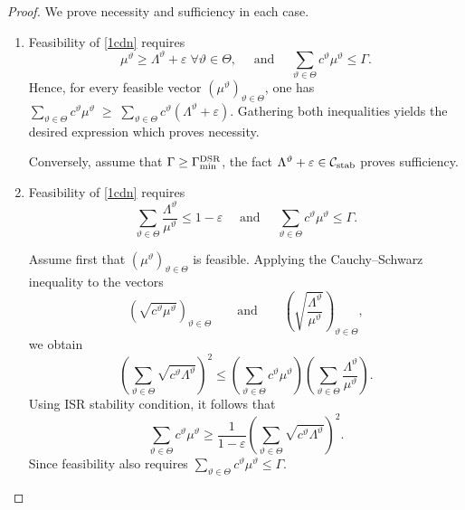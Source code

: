 \documentclass[a4paper,11pt,reqno]{amsart}
\begin{document}
\begin{proof}
We prove necessity and sufficiency in each case.

\medskip

\begin{enumerate}[label=\roman*), ref=\roman*]
    \item Feasibility of \eqref{1cdn} requires 
    $$
\mu^\vartheta \ge \Lambda^\vartheta+\varepsilon
\; \forall \vartheta\in\Theta, \quad \text{ and }\quad
\sum_{\vartheta\in\Theta} c^\vartheta \mu^\vartheta \le \Gamma.
$$
Hence, for every feasible vector $(\mu^\vartheta)_{\vartheta\in\Theta}$, one has  $\sum_{\vartheta\in\Theta} c^\vartheta \mu^\vartheta
\;\ge\;
\sum_{\vartheta\in\Theta} c^\vartheta(\Lambda^\vartheta+\varepsilon)$. Gathering both inequalities yields the desired expression which proves necessity.

Conversely, assume that $\Gamma \ge \Gamma_{\rm min}^{\rm DSR}$, the fact $\Lambda^\vartheta+\varepsilon\in \mathcal{C}_{\rm stab}$ proves sufficiency.

\item 
Feasibility of \eqref{1cdn} requires
$$
\sum_{\vartheta\in\Theta}\frac{\Lambda^\vartheta}{\mu^\vartheta}\le 1-\varepsilon \quad \text{ and }\quad \sum_{\vartheta\in\Theta} c^\vartheta \mu^\vartheta \le \Gamma.
$$

Assume first that $(\mu^\vartheta)_{\vartheta\in\Theta}$ is feasible. Applying the Cauchy--Schwarz inequality to the vectors
$$
\left(\sqrt{c^\vartheta\mu^\vartheta}\right)_{\vartheta\in\Theta}
\qquad\text{and}\qquad
\left(\sqrt{\frac{\Lambda^\vartheta}{\mu^\vartheta}}\right)_{\vartheta\in\Theta},
$$
we obtain
$$
\left(\sum_{\vartheta\in\Theta}\sqrt{c^\vartheta\Lambda^\vartheta}\right)^2
\le
\left(\sum_{\vartheta\in\Theta} c^\vartheta\mu^\vartheta\right)
\left(\sum_{\vartheta\in\Theta}\frac{\Lambda^\vartheta}{\mu^\vartheta}\right).
$$
Using ISR stability condition, it follows that
$$
\sum_{\vartheta\in\Theta} c^\vartheta\mu^\vartheta
\ge
\frac{1}{1-\varepsilon}
\left(\sum_{\vartheta\in\Theta}\sqrt{c^\vartheta\Lambda^\vartheta}\right)^2.
$$
Since feasibility also requires $\sum_{\vartheta\in\Theta} c^\vartheta\mu^\vartheta\le\Gamma$.


\end{enumerate}
\end{proof}
\end{document}
